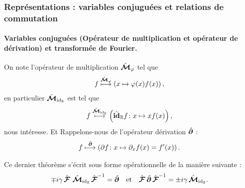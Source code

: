 \subsubsection{Représentations : variables conjuguées et relations de commutation}

\paragraph{Variables conjuguées {\tiny (Opérateur de multiplication et opérateur de dérivation)} et transformée de Fourier.}

On note l'opérateur de multiplication $\hat{\bm{\mathcal M}}_{\varphi}$ tel que 
\begin{eqnarray}
    f \overset{\hat{\bm{\mathcal M}}_{\varphi}}{\longmapsto} \left ( x \mapsto \varphi(x) f(x)  \right ),
\end{eqnarray}
en particulier $\hat{\bm{\mathcal M}}_{\mathrm{id}_{\mathbb R}}$ est tel que 
\begin{eqnarray}
    f \overset{\hat{\bm{\mathcal M}}_{\mathrm{id}_{\mathbb R}}}{\longmapsto} \left ( \hat{\bm{\mathrm{id}}}_{\mathbb R} f \colon  x \mapsto x f(x)  \right ),
\end{eqnarray}
nous intéresse. Et Rappelons-nous de l'opérateur dérivation $\hat{\bm{\partial}}$ :
\begin{eqnarray}
    f \overset{\hat{\bm{\partial}}}{\longmapsto} \left ( \partial f \colon  x \mapsto \partial_x f(x) = f'(x)   \right ).
\end{eqnarray}

Ce dernier théorème s’écrit sous forme opérationnelle de la manière suivante :
\begin{eqnarray}
    \mp i \gamma \,\hat{\bm{\mathcal{F}}} \, \,\hat{\bm{\mathcal M}}_{\mathrm{id}_{\mathbb R}} \, \hat{\bm{\mathcal{F}}}^{-1} = \hat{\bm{\partial}} \quad \mbox{et} \quad  \hat{\bm{\mathcal{F}}}\, \hat{\bm{\partial}} \, \hat{\bm{\mathcal{F}}}^{-1} = \pm i \gamma \, \hat{\bm{\mathcal M}}_{\mathrm{id}_{\mathbb R}}. 
\end{eqnarray}

